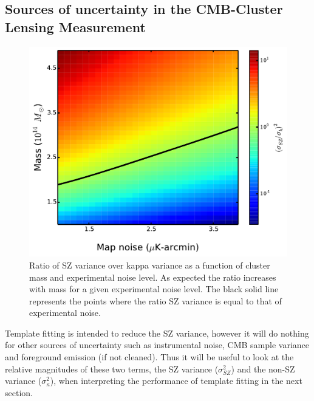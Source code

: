 \subsection{Sources of uncertainty in the CMB-Cluster Lensing Measurement}
\begin{figure}[htb]
\includegraphics[width=\linewidth, keepaspectratio]{figs/contour_plot.pdf}
 \caption{
 Ratio of SZ variance over kappa variance as a function of cluster mass and experimental noise level. 
 As expected the ratio increases with mass for a given experimental noise level. 
 The black solid line represents the points where the ratio SZ variance is equal to that of experimental noise.
  }
 \label{fig:variance}
\end{figure}

Template fitting is intended to reduce the SZ variance, however it will do nothing for other sources of uncertainty such as instrumental noise, CMB sample variance and foreground emission (if not cleaned). 
Thus it will be useful to look at the relative magnitudes of these two terms, the SZ variance ($\sigma_{SZ}^{2}$) and the non-SZ variance ($\sigma_{\kappa}^{2}$), when interpreting the performance of template fitting in the next section. 



